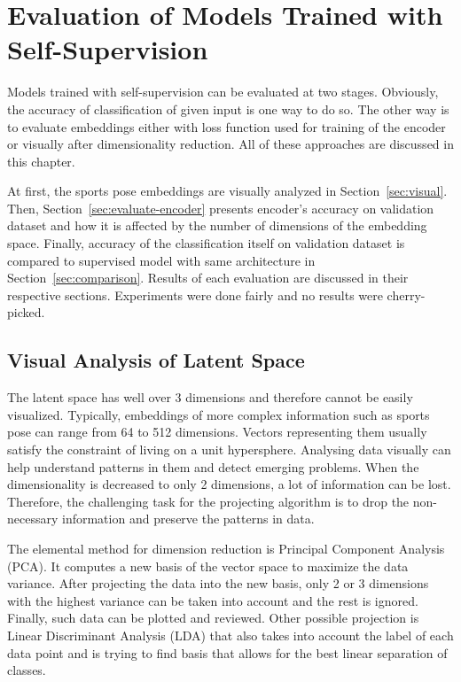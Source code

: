 \chapter{\label{chap:evaluation}Evaluation of Models Trained with Self-Supervision}

Models trained with self-supervision can be evaluated at two stages. Obviously, the accuracy of classification of given input is one way to do so. The other way is to evaluate embeddings either with loss function used for training of the encoder or visually after dimensionality reduction. All of these approaches are discussed in this chapter.

At first, the sports pose embeddings are visually analyzed in Section~\ref{sec:visual}. Then, Section~\ref{sec:evaluate-encoder} presents encoder's accuracy on validation dataset and how it is affected by the number of dimensions of the embedding space. Finally, accuracy of the classification itself on validation dataset is compared to supervised model with same architecture in Section~\ref{sec:comparison}. Results of each evaluation are discussed in their respective sections. Experiments were done fairly and no results were cherry-picked.

\section{\label{sec:visual}Visual Analysis of Latent Space}

The latent space has well over 3 dimensions and therefore cannot be easily visualized. Typically, embeddings of more complex information such as sports pose can range from 64 to 512 dimensions. Vectors representing them usually satisfy the constraint of living on a unit hypersphere. Analysing data visually can help understand patterns in them and detect emerging problems. When the dimensionality is decreased to only 2 dimensions, a lot of information can be lost. Therefore, the challenging task for the projecting algorithm is to drop the non-necessary information and preserve the patterns in data.

The elemental method for dimension reduction is Principal Component Analysis (PCA). It computes a new basis of the vector space to maximize the data variance. After projecting the data into the new basis, only 2 or 3 dimensions with the highest variance can be taken into account and the rest is ignored. Finally, such data can be plotted and reviewed. Other possible projection is Linear Discriminant Analysis (LDA) that also takes into account the label of each data point and is trying to find basis that allows for the best linear separation of classes.

